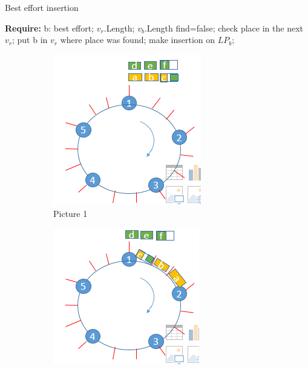 \documentclass{article}
\begin{document}
\begin{algorithm}
\caption{Best effort insertion}
\begin{algorithmic}
\State \textbf{Require:} b: best effort; $v_{r}$.Length; $v_{b}$.Length
\State find=false;
\State check place in the next $v_{r}$;
\EndIf
\EndWhile
{}
\State put b in $v_{r}$ where place was found;
\Else
\State make insertion on $LP_{b}$;
\EndIf
\end{algorithmic}
\end{algorithm}
\newpage
\begin{figure}
  \begin{subfigure}[b]{0.3\textwidth}
    \includegraphics[width=\textwidth]{model31.PNG}
    \caption{Picture 1}
    \label{fig:1}
  \end{subfigure}
  \begin{subfigure}[b]{0.3\textwidth}
    \includegraphics[width=\textwidth]{model32.PNG}

\end{subfigure}
\end{figure}
\end{document}
